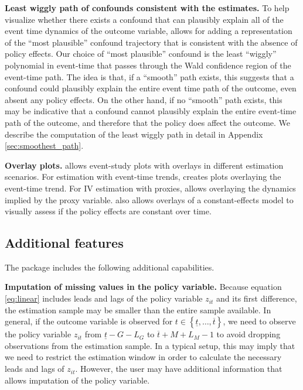 \documentclass[bib]{./sty/statapress}
\begin{document}
\noindent \textbf{Least wiggly path of confounds consistent with the estimates.} %
To help visualize whether there exists a confound that can plausibly explain all of the event time dynamics of the outcome variable, \xtevent allows for adding a representation of the ``most plausible'' confound trajectory that is consistent with the absence of policy effects.
Our choice of ``most plausible'' confound is the least ``wiggly'' polynomial in event-time that passes through the Wald confidence region of the event-time path.
The idea is that, if a ``smooth'' path exists, this suggests that a confound could plausibly explain the entire event time path of the outcome, even absent any policy effects.
On the other hand, if no ``smooth'' path exists, this may be indicative that a confound cannot plausibly explain the entire event-time path of the outcome, and therefore that the policy does affect the outcome.
We describe the computation of the least wiggly path in detail in Appendix \ref{sec:smoothest_path}.

\noindent \textbf{Overlay plots.}
\xteventplot allows event-study plots with overlays in different estimation scenarios. For estimation with event-time trends, \xteventplot creates plots overlaying the event-time trend.
For IV estimation with proxies, \xteventplot allows overlaying the dynamics implied by the proxy variable.
\xteventplot also allows overlays of a constant-effects model to visually assess if the policy effects are constant over time.


\subsection{Additional features}

The package includes the following additional capabilities.

\noindent \textbf{Imputation of missing values in the policy variable.}
Because equation \eqref{eq:linear} includes leads and lags of the policy variable $z_{it}$ and its first difference, the estimation sample may be smaller than the entire sample available.
In general, if the outcome variable is observed for $t \in \left\{\underline{t},\ldots,\overline{t} \right\}$, we need to observe the policy variable $z_{it}$ from $\underline{t} - G - L_G$ to $\overline{t} + M + L_M -1$ to avoid dropping observations from the estimation sample.
In a typical setup, this may imply that we need to restrict the estimation window in order to calculate the necessary leads and lags of $z_{it}$.
However, the user may have additional information that allows imputation of the policy variable.
\end{document}
